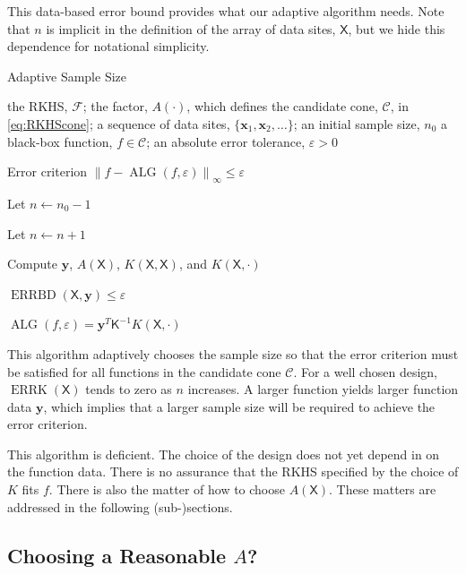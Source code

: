 \documentclass[]{mcom-l}
\theoremstyle{theorem}
\theoremstyle{remark}
\DeclareMathOperator{\ALG}{ALG}
\DeclareMathOperator{\errK}{ERRK}
\DeclareMathOperator{\errBd}{ERRBD}
\newcommand{\mK}{\mathsf{K}}
\newcommand{\mX}{\mathsf{X}}
\newcommand{\bx}{{\boldsymbol{x}}}
\newcommand{\by}{{\boldsymbol{y}}}
\newcommand{\cc}{\mathcal{C}}
\newcommand{\calf}{{\mathcal{F}}}
\newcommand{\norm}[2][{}]{\ensuremath{\left \lVert #2 \right \rVert}_{#1}}
\begin{document}
This data-based error bound provides what  our adaptive algorithm needs.  Note that $n$ is implicit in the definition of the array of data sites, $\mX$, but we hide this dependence for notational simplicity.

\begin{algorithm}[H]
\caption{Adaptive Sample Size \label{alg:basicadapt}}
	\begin{algorithmic}
	\PARAM the RKHS, $\calf$; the factor, $A(\cdot)$, which defines  the candidate cone, $\cc$, in \eqref{eq:RKHScone};  a sequence of data sites, $\{\bx_1, \bx_2, \ldots \}$; an initial sample size, $n_0$
	\INPUT a black-box function, $f \in \cc$; an absolute error tolerance, $\varepsilon>0$

    \Ensure Error criterion $\norm[\infty]{f - \ALG(f,\varepsilon)} \le \varepsilon$

   \State Let $n \leftarrow n_0 -1$

\Repeat

\State Let $n \leftarrow n + 1$

\State Compute $\by$, $A(\mX)$, $K(\mX,\mX)$, and $K(\mX,\cdot)$

\Until $\errBd(\mX,\by) \le \varepsilon$

\RETURN $\ALG(f,\varepsilon) = \by^T \mK^{-1} K(\mX,\cdot)$

\end{algorithmic}
\end{algorithm}

This algorithm adaptively chooses the sample size so that the error criterion must be satisfied for all functions in the candidate cone $\cc$.  For a well chosen design, $\errK(\mX)$ tends to zero as $n$ increases.  A larger function yields larger function data $\by$, which implies that a larger sample size will be required to achieve the error criterion.

This algorithm is deficient.  The choice of the design does not yet depend in on the function data.  There is no assurance that the RKHS specified by the choice of $K$ fits $f$.  There is also the matter of how to choose $A(\mX)$.  These matters are addressed in the following (sub-)sections.


\subsection{Choosing a Reasonable $A$?}
\end{document}
